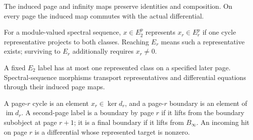\begin{theorem}
\label{sem:SpectralSequence:naturality}
The induced page and infinity maps preserve identities and composition. On every page the induced map commutes with the actual differential.
\end{theorem}

\begin{definition}
\label{sem:SpectralSequence:representatives}
For a module-valued spectral sequence, $x\in E_2^p$ represents $x_r\in E_r^p$ if one cycle representative projects to both classes. Reaching $E_r$ means such a representative exists; surviving to $E_r$ additionally requires $x_r\neq0$.
\end{definition}

\begin{theorem}
\label{sem:SpectralSequence:representatives-unique}
A fixed $E_2$ label has at most one represented class on a specified later page. Spectral-sequence morphisms transport representatives and differential equations through their induced page maps.
\end{theorem}

\begin{definition}
\label{sem:SpectralSequence:cycles-boundaries}
A page-$r$ cycle is an element $x_r\in\ker d_r$, and a page-$r$ boundary is an element of $\operatorname{im}d_r$. A second-page label is a boundary by page $r$ if it lifts from the boundary subobject at page $r+1$; it is a final boundary if it lifts from $B_\infty$. An incoming hit on page $r$ is a differential whose represented target is nonzero.
\end{definition}

